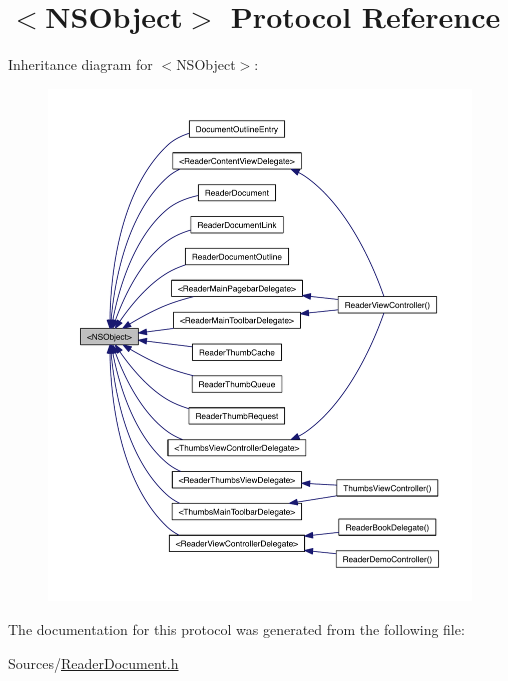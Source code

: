 \hypertarget{class_n_s_object-p}{\section{$<$N\-S\-Object$>$ Protocol Reference}
\label{d0/d10/class_n_s_object-p}
}


Inheritance diagram for $<$N\-S\-Object$>$\-:
\nopagebreak
\begin{figure}[H]
\begin{center}
\leavevmode
\includegraphics[width=350pt]{da/d97/class_n_s_object-p__inherit__graph}
\end{center}
\end{figure}


The documentation for this protocol was generated from the following file\-:\begin{DoxyCompactItemize}
\item 
Sources/\hyperlink{_reader_document_8h}{Reader\-Document.\-h}\end{DoxyCompactItemize}
